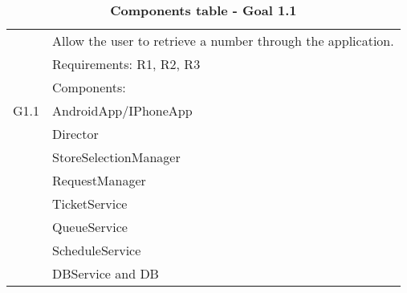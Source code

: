 \newpage
\begin{table}
\begin{flushleft}
\begin{tabular}{|l|l|}
\hline
\cellcolor[HTML]{EC8D78}& \cellcolor[HTML]{F4D5CE}Allow the user to retrieve a number through the application.\\
\cline{2-2}
\cellcolor[HTML]{EC8D78}& \cellcolor[HTML]{F4D5CE}Requirements: R1, R2, R3\\
\cline{2-2}
\cellcolor[HTML]{EC8D78}&Components:\\

\cellcolor[HTML]{EC8D78}G1.1&\quad\quad AndroidApp/IPhoneApp\\

\cellcolor[HTML]{EC8D78}&\quad\quad	Director \\

\cellcolor[HTML]{EC8D78}&\quad\quad	StoreSelectionManager \\

\cellcolor[HTML]{EC8D78}&\quad\quad	RequestManager \\

\cellcolor[HTML]{EC8D78}&\quad\quad\quad\quad	TicketService \\

\cellcolor[HTML]{EC8D78}&\quad\quad\quad\quad	QueueService \\

\cellcolor[HTML]{EC8D78}&\quad\quad\quad\quad	ScheduleService\\ 

\cellcolor[HTML]{EC8D78}&\quad\quad	DBService and DB \\
\hline
\end{tabular}
\end{flushleft}
\caption{\textbf{Components table - Goal 1.1}}
\label{tab:comp1}
\end{table}


